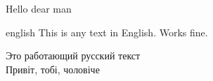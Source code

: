 \documentclass[a4paper]{article}
\begin{document}
Hello dear man
\begin{otherlanguage*}{english}
This is any text in English. Works fine.
\end{otherlanguage*}

Это работающий русский текст\\
Привіт, тобі, чоловіче
\end{document}
